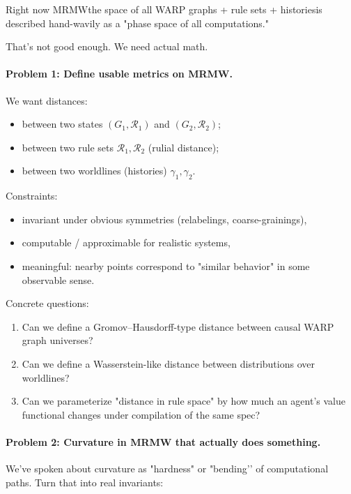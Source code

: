 Right now MRMW\emd{}the space of all WARP graphs + rule sets + histories\emd{}is described
hand-wavily as a "phase space of all computations."

That’s not good enough. We need actual math.

\paragraph{Problem 1: Define usable metrics on MRMW.}

We want distances:

\begin{itemize}
  \item between two states $(G_1,\mathcal{R}_1)$ and $(G_2,\mathcal{R}_2)$;
  \item between two rule sets $\mathcal{R}_1, \mathcal{R}_2$ (rulial distance);
  \item between two worldlines (histories) $\gamma_1, \gamma_2$.
\end{itemize}

Constraints:

\begin{itemize}
  \item invariant under obvious symmetries (relabelings, coarse-grainings),
  \item computable / approximable for realistic systems,
  \item meaningful: nearby points correspond to "similar behavior" in some observable sense.
\end{itemize}

Concrete questions:

\begin{enumerate}
  \item Can we define a Gromov–Hausdorff-type distance between causal WARP graph universes?
  \item Can we define a Wasserstein-like distance between distributions over worldlines?
  \item Can we parameterize "distance in rule space" by how much an agent’s value functional changes under compilation of the same spec?
\end{enumerate}

\paragraph{Problem 2: Curvature in MRMW that actually does something.}

We’ve spoken about curvature as "hardness" or "bending’’ of computational paths.
Turn that into real invariants:

